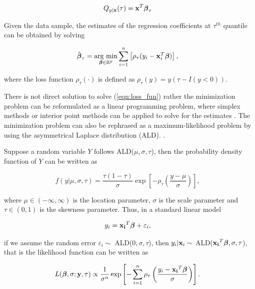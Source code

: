 \documentclass[12pt]{article}
\begin{document}
\begin{equation}\label{eqn:lqr}
Q_{y|{\bf x}}(\tau)={\bf x}^{T}\boldsymbol{\beta}_{\tau}
\end{equation}

Given the data sample, the estimates of the regression coefficients at $\tau^{th}$ quantile can be obtained by solving 

\begin{equation}\label{eqn:loss_fun}
\hat{\boldsymbol{\beta}}_{\tau}=\underset{\boldsymbol{\beta}\in \mathbb{R}^{p}}{\mbox{arg min}}\sum_{i=1}^{n}\left[\rho_{\tau}(y_{i}-{\bf x}_i^{T}\boldsymbol{\beta})\right],
\end{equation}

where the loss function $\rho_{\tau}(\cdot)$ is defined as $\rho_{\tau}(y)=y(\tau-{I}{(y<0)}).$ \par

\noindent There is not direct solution to solve (\ref{eqn:loss_fun}) rather the minimization problem can be reformulated as a linear programming problem, where simplex methods or interior point methods can be applied to solve for the estimates \cite{koenker2005quantile}. The minimization problem can also be rephrased as a maximum-likelihood problem by using the asymmetrical Laplace distribution (ALD). \cite{koenker1999goodness} \cite{yu2001bayesian}.

Suppose a random variable $Y$ follows ALD($\mu, \sigma, \tau$), then the probability density function of $Y$ can be written as

\begin{equation}\label{eqn:ald}
f(y|\mu, \sigma, \tau)=\frac{\tau(1-\tau)}{\sigma}\exp\left[-\rho_{\tau}\left(\frac{y-\mu}{\sigma}\right)\right],
\end{equation}

where $\mu\in(-\infty, \infty)$ is the location parameter, $\sigma$ is the scale parameter and $\tau\in(0, 1)$ is the skewness parameter. Thus, in a standard linear model

\begin{equation}\label{eqn:lm}
y_i={\bf x_i}^{T}\boldsymbol{\beta}+\varepsilon_i,
\end{equation}

if we assume the random error $\varepsilon_i\sim$ ALD($0, \sigma, \tau$), then $y_i|{\bf x}_i\sim$
ALD(${\bf x_i}^{T}\boldsymbol{\beta}, \sigma, \tau$), that is the likelihood function can be written as

\begin{equation}\label{eqn:yald}
L(\boldsymbol{\beta}, \sigma; {\bf y}, \tau)\propto\frac{1}{\sigma^n}\exp\left[-\sum_{i=1}^n\rho_{\tau}\left(\frac{y_i-{\bf x_i}^{T}\boldsymbol{\beta}}{\sigma}\right)\right].
\end{equation}
\end{document}
